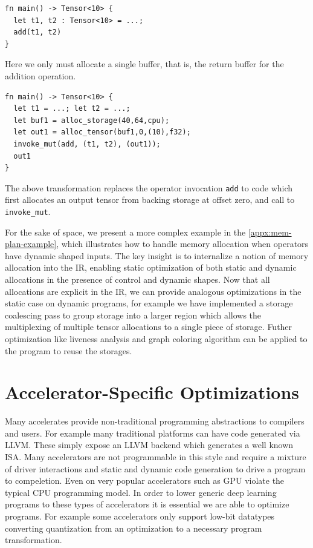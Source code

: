 \begin{verbatim}
fn main() -> Tensor<10> {
  let t1, t2 : Tensor<10> = ...;
  add(t1, t2)
}
\end{verbatim}

Here we only must allocate a single buffer, that is, the return buffer for the addition operation.

\begin{verbatim}
fn main() -> Tensor<10> {
  let t1 = ...; let t2 = ...;
  let buf1 = alloc_storage(40,64,cpu);
  let out1 = alloc_tensor(buf1,0,(10),f32);
  invoke_mut(add, (t1, t2), (out1));
  out1
}
\end{verbatim}

The above transformation replaces the operator invocation \verb|add| to code which
first allocates an output tensor from backing storage at offset zero, and call to
\verb|invoke_mut|.

For the sake of space, we present a more complex example in the \autoref{appx:mem-plan-example}, which illustrates how to handle memory allocation when operators have dynamic shaped inputs.
The key insight is to internalize a notion of memory allocation into the IR, enabling static optimization of
both static and dynamic allocations in the presence of control and dynamic shapes.
Now that all allocations are explicit in the IR, we can provide analogous optimizations in the static
case on dynamic programs, for example we have implemented a storage coalescing pass to group storage
into a larger region which allows the multiplexing of multiple tensor allocations to a single piece of storage.
Futher optimization like liveness analysis and graph coloring algorithm can be applied to the program to reuse  the storages.


\section{Accelerator-Specific Optimizations}
\label{sec:accel-opts}

Many accelerates provide non-traditional programming
    abstractions to compilers and users.
For example many traditional platforms can have
    code generated via LLVM.
These simply expose an LLVM backend which generates
    a well known ISA.
Many accelerators are not programmable in this style
    and require a mixture of driver interactions
    and static and dynamic code generation to
    drive a program to compeletion.
Even on very popular accelerators such as GPU
    violate the typical CPU programming model.
In order to lower generic deep learning programs
    to these types of accelerators it is
    essential we are able to optimize programs.
For example some accelerators only support
    low-bit datatypes converting quantization
    from an optimization to a necessary program
    transformation.

